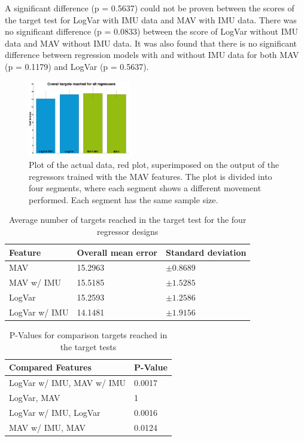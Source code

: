 	A significant difference (p = 0.5637) could not be proven between the scores of the target test for LogVar with IMU data and MAV with IMU data. There was no significant difference (p = 0.0833) between the score of LogVar without IMU data and MAV without IMU data. It was also found that there is no significant difference between regression models with and without IMU data for both MAV (p = 0.1179) and LogVar (p = 0.5637).
	
	\begin{figure}[!thpb]
		\centering
		\includegraphics[width=0.4\textwidth]{figures/sumMoreBarsWithTargetsReachedForAllRegressors}  %
		\caption{Plot of the actual data, red plot, superimposed on the output of the regressors trained with the MAV features. The plot is divided into four segments, where each segment shows a different movement performed. Each segment has the same sample size.}
		\label{fig:TargetScoresTargets}  %
	\end{figure}	
	
	\begin{table}[!thpb]
		\begin{center}
			\begin{tabular}{l l l}
				\hline
				\textbf{Feature} & \textbf{Overall mean error} & \textbf{Standard deviation}\\
				\hline
				MAV & 15.2963 & $\pm 0.8689$ \\
				MAV w/ IMU & 15.5185 & $\pm 1.5285$ \\
				LogVar & 15.2593 & $\pm 1.2586$ \\
				LogVar w/ IMU & 14.1481 & $\pm 1.9156$ \\
				\hline
			\end{tabular}
			\caption{Average number of targets reached in the target test for the four regressor designs}
		\end{center}
	\end{table}
	
	\begin{table}[!thpb]
		\begin{center}
			\begin{tabular}{l l}
				\hline
				\textbf{Compared Features} & \textbf{P-Value}\\
				\hline
				LogVar w/ IMU, MAV w/ IMU & 0.0017 \\
				LogVar, MAV & 1 \\
				LogVar w/ IMU, LogVar & 0.0016 \\
				MAV w/ IMU, MAV & 0.0124 \\
				\hline
			\end{tabular}
			\caption{P-Values for comparison targets reached in the target tests}
		\end{center}
	\end{table}
	
